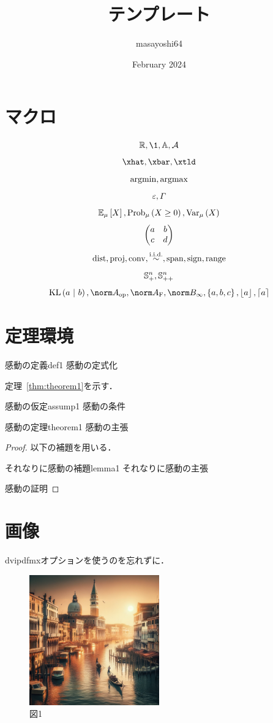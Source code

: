 \documentclass[11pt,a4paper, dvipdfmx]{article}
\title{テンプレート}
\author{masayoshi64}
\date{February 2024}
\begin{document}
\maketitle

\section{マクロ}
\[\R, \1, \Abb, \cA\]
\[\xhat, \xbar, \xtld\]
\[\operatorname*{argmin}, \operatorname*{argmax}\]
\[\varepsilon, \varGamma\]
\[\Expec[\mu]{X}, \Prob[\mu]{X \geq 0}, \Var[\mu]{X}\]
\[\begin{pmatrix} 
        a & b                \\
        c & d
     \end{pmatrix}\]
\[\mathrm{dist}, \mathrm{proj}, \mathrm{conv}, \overset{\mathrm{i.i.d.}}{\sim}, \mathrm{span}, \mathrm{sign}, \mathrm{range} \]
\[\mathbb{S}^{n}_+, \mathbb{S}^{n}_{++}\]
\[\kl{a}{b}, \opnorm{A}, \frobnorm{A}, \infnorm{B}, \set{a, b, c}, \floor{a}, \ceil{a}\]

\section{定理環境}
\begin{definition}{感動の定義}{def1}
    感動の定式化
\end{definition}
定理~\ref{thm:theorem1}を示す．
\begin{assumption}{感動の仮定}{assump1}
    感動の条件
\end{assumption}
\begin{theorem}{感動の定理}{theorem1}
    感動の主張
\end{theorem}
\begin{proof}
    以下の補題を用いる．
    \begin{lemma}{それなりに感動の補題}{lemma1}
        それなりに感動の主張
    \end{lemma}
    感動の証明
\end{proof}

\section{画像}
dvipdfmxオプションを使うのを忘れずに．
\begin{figure}[htbp]
    \centering
    \includegraphics[width=0.5\textwidth]{figs/test.png}
    \caption{図1}
    \label{fig:fig1}
\end{figure}
\end{document}
